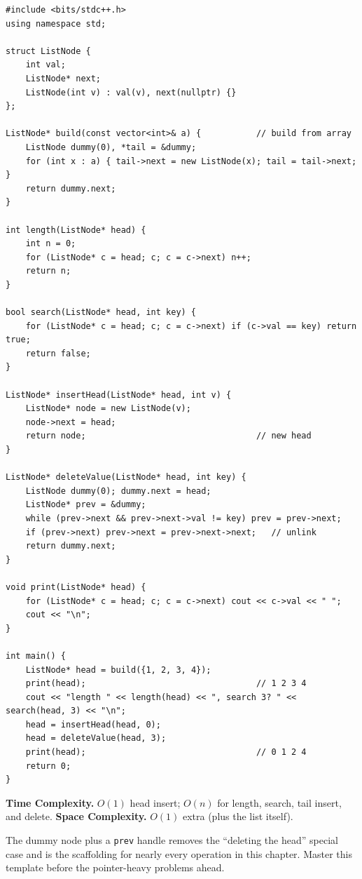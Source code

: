 \begin{lstlisting}
#include <bits/stdc++.h>
using namespace std;

struct ListNode {
    int val;
    ListNode* next;
    ListNode(int v) : val(v), next(nullptr) {}
};

ListNode* build(const vector<int>& a) {           // build from array
    ListNode dummy(0), *tail = &dummy;
    for (int x : a) { tail->next = new ListNode(x); tail = tail->next; }
    return dummy.next;
}

int length(ListNode* head) {
    int n = 0;
    for (ListNode* c = head; c; c = c->next) n++;
    return n;
}

bool search(ListNode* head, int key) {
    for (ListNode* c = head; c; c = c->next) if (c->val == key) return true;
    return false;
}

ListNode* insertHead(ListNode* head, int v) {
    ListNode* node = new ListNode(v);
    node->next = head;
    return node;                                  // new head
}

ListNode* deleteValue(ListNode* head, int key) {
    ListNode dummy(0); dummy.next = head;
    ListNode* prev = &dummy;
    while (prev->next && prev->next->val != key) prev = prev->next;
    if (prev->next) prev->next = prev->next->next;   // unlink
    return dummy.next;
}

void print(ListNode* head) {
    for (ListNode* c = head; c; c = c->next) cout << c->val << " ";
    cout << "\n";
}

int main() {
    ListNode* head = build({1, 2, 3, 4});
    print(head);                                  // 1 2 3 4
    cout << "length " << length(head) << ", search 3? " << search(head, 3) << "\n";
    head = insertHead(head, 0);
    head = deleteValue(head, 3);
    print(head);                                  // 0 1 2 4
    return 0;
}
\end{lstlisting}

\begin{complexitybox}
\textbf{Time Complexity.} $O(1)$ head insert; $O(n)$ for length, search,
tail insert, and delete. \textbf{Space Complexity.} $O(1)$ extra (plus the
list itself).
\end{complexitybox}

\begin{takeawaybox}
The dummy node plus a \texttt{prev} handle removes the ``deleting the head''
special case and is the scaffolding for nearly every operation in this
chapter. Master this template before the pointer-heavy problems ahead.
\end{takeawaybox}
